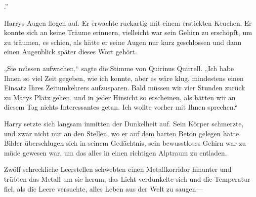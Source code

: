 
.”

\hplettrineextrapara
Harrys Augen flogen auf. Er erwachte ruckartig mit einem erstickten Keuchen. Er konnte sich an keine Träume erinnern, vielleicht war sein Gehirn zu erschöpft, um zu träumen, es schien, als hätte er seine Augen nur kurz geschlossen und dann einen Augenblick später dieses Wort gehört.

„Sie müssen aufwachen,“ sagte die Stimme von Quirinus Quirrell. „Ich habe Ihnen so viel Zeit gegeben, wie ich konnte, aber es wäre klug, mindestens einen Einsatz Ihres Zeitumkehrers aufzusparen. Bald müssen wir vier Stunden zurück zu Marys Platz gehen, und in jeder Hinsicht so erscheinen, als hätten wir an diesem Tag nichts Interessantes getan. Ich wollte vorher mit Ihnen sprechen.“

Harry setzte sich langsam inmitten der Dunkelheit auf. Sein Körper schmerzte, und zwar nicht nur an den Stellen, wo er auf dem harten Beton gelegen hatte. Bilder überschlugen sich in seinem Gedächtnis, sein bewusstloses Gehirn war zu müde gewesen war, um das alles in einen richtigen Alptraum zu entladen.

Zwölf schreckliche Leerstellen schwebten einen Metallkorridor hinunter und trübten das Metall um sie herum, das Licht verdunkelte sich und die Temperatur fiel, als die Leere versuchte, alles Leben aus der Welt zu saugen—

